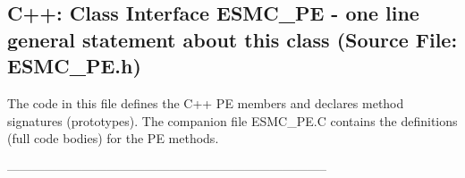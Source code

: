  
\parskip        0pt
\parindent      0pt
\baselineskip  11pt
 
\def\bv{\begin{verbatim}}
\def\ev{\end{verbatim}}
\def\be{\begin{equation}}
\def\ee{\end{equation}}
\def\bea{\begin{eqnarray}}
\def\eea{\end{eqnarray}}
\def\bi{\begin{itemize}}
\def\ei{\end{itemize}}
\def\bn{\begin{enumerate}}
\def\en{\end{enumerate}}
\def\bd{\begin{description}}
\def\ed{\end{description}}
\def\({\left (}
\def\){\right )}
\def\[{\left [}
\def\]{\right ]}
\def\<{\left  \langle}
\def\>{\right \rangle}
\def\cI{{\cal I}}
\def\diag{\mathop{\rm diag}}
\def\tr{\mathop{\rm tr}}


 
\subsection{C++:  Class Interface ESMC\_PE - one line general statement about this class (Source File: ESMC\_PE.h)}


  
  
   The code in this file defines the C++ PE members and declares method 
   signatures (prototypes).  The companion file ESMC\_PE.C contains
   the definitions (full code bodies) for the PE methods.
  
   
  
  -----------------------------------------------------------------------------
   
